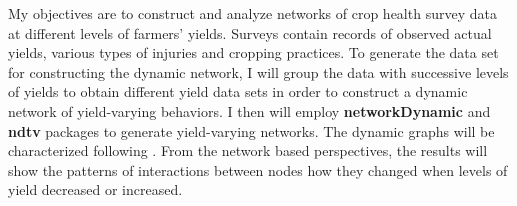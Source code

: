 My objectives are to construct and analyze networks of crop health survey data at different levels of farmers' yields. Surveys contain records of observed actual yields, various types of injuries and cropping practices. To generate the data set for constructing the dynamic network, I will group the data with successive levels of yields to obtain different yield data sets in order to construct a dynamic network of yield-varying behaviors. I then will employ \textbf{networkDynamic}  and \textbf{ndtv}  packages to generate yield-varying networks. The dynamic graphs will be characterized following . From the network based perspectives, the results will show the patterns of interactions between nodes how they changed when levels of yield decreased or increased.




